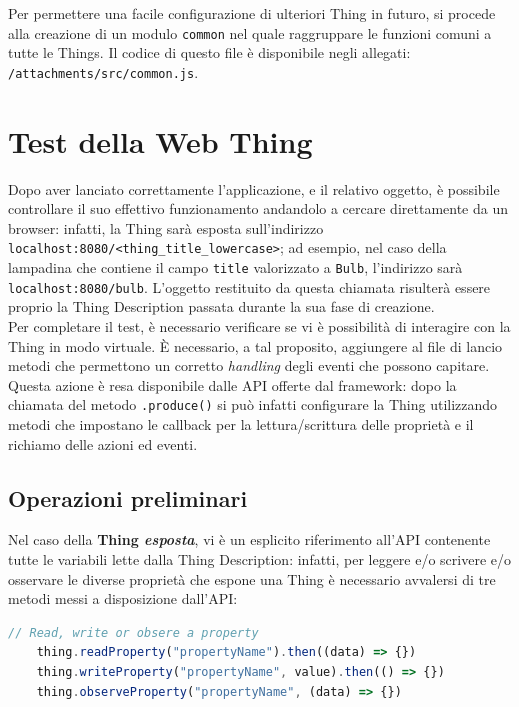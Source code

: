 \documentclass[12pt,a4paper,openright,oneside]{report}
\begin{document}
Per permettere una facile configurazione di ulteriori Thing in futuro, si procede alla creazione di un modulo \texttt{common} nel quale raggruppare le funzioni comuni a tutte le Things. Il codice di questo file è disponibile negli allegati: \texttt{/attachments/src/common.js}.\\


\section{Test della Web Thing}
Dopo aver lanciato correttamente l'applicazione, e il relativo oggetto, è possibile controllare il suo effettivo funzionamento andandolo a cercare direttamente da un browser: infatti, la Thing sarà esposta sull'indirizzo \texttt{localhost:8080/<thing\_title\_lowercase>}; ad esempio, nel caso della lampadina che contiene il campo \texttt{title} valorizzato a \texttt{Bulb}, l'indirizzo sarà\\ \texttt{localhost:8080/bulb}. L'oggetto restituito da questa chiamata risulterà essere proprio la Thing Description passata durante la sua fase di creazione.\\

Per completare il test, è necessario verificare se vi è possibilità di interagire con la Thing in modo virtuale. È necessario, a tal proposito, aggiungere al file di lancio metodi che permettono un corretto \textit{handling} degli eventi che possono capitare. Questa azione è resa disponibile dalle API offerte dal framework: dopo la chiamata del metodo \texttt{.produce()} si può infatti configurare la Thing utilizzando metodi che impostano le callback per la lettura/scrittura delle proprietà e il richiamo delle azioni ed eventi.\\

\subsection{Operazioni preliminari}

Nel caso della \textbf{Thing \textit{esposta}}, vi è un esplicito riferimento all'API contenente tutte le variabili lette dalla Thing Description: infatti, per leggere e/o scrivere e/o osservare le diverse proprietà che espone una Thing è necessario avvalersi di tre metodi messi a disposizione dall'API:
\begin{lstlisting}[language=JavaScript,caption={Metodi per leggere, scrivere o osservare}]
	// Read, write or obsere a property
	thing.readProperty("propertyName").then((data) => {})
	thing.writeProperty("propertyName", value).then(() => {})
	thing.observeProperty("propertyName", (data) => {})
\end{lstlisting}
\end{document}
